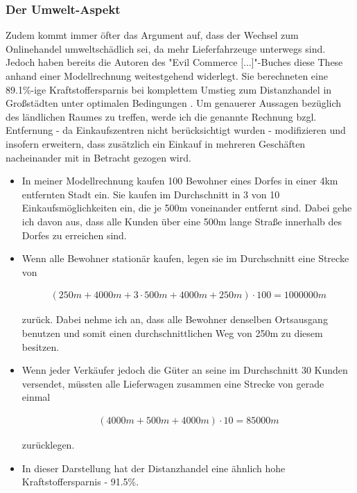 \begin{folding} \subsubsection{Der Umwelt-Aspekt} %

Zudem kommt immer öfter das Argument auf, dass der Wechsel zum Onlinehandel umweltschädlich sei, da mehr Lieferfahrzeuge unterwegs sind. Jedoch haben bereits die Autoren des "Evil Commerce [...]"-Buches diese These anhand einer Modellrechnung weitestgehend widerlegt. Sie berechneten eine 89.1\%-ige Kraftstoffersparnis bei komplettem Umstieg zum Distanzhandel in Großstädten unter optimalen Bedingungen \cite[S. 25f]{evilcom}. Um genauerer Aussagen bezüglich des ländlichen Raumes zu treffen, werde ich die genannte Rechnung bzgl. Entfernung - da Einkaufszentren nicht berücksichtigt wurden - modifizieren und insofern erweitern, dass zusätzlich ein Einkauf in mehreren Geschäften nacheinander mit in Betracht gezogen wird.

\begin{itemize}

\item In meiner Modellrechnung kaufen 100 Bewohner eines Dorfes in einer 4km entfernten Stadt ein. Sie kaufen im Durchschnitt in 3 von 10 Einkaufsmöglichkeiten ein, die je 500m voneinander entfernt sind. Dabei gehe ich davon aus, dass alle Kunden über eine 500m lange Straße innerhalb des Dorfes zu erreichen sind.

\item Wenn alle Bewohner stationär kaufen, legen sie im Durchschnitt eine Strecke von 

\begin{align}(250m + 4000m + 3 \cdot 500m + 4000m + 250m) \cdot 100 = 1000000m\end{align}

 zurück. Dabei nehme ich an, dass alle Bewohner denselben Ortsausgang benutzen und somit einen durchschnittlichen Weg von 250m zu diesem besitzen.

\item Wenn jeder Verkäufer jedoch die Güter an seine im Durchschnitt 30 Kunden versendet, müssten alle Lieferwagen zusammen eine Strecke von gerade einmal 

\begin{align}(4000m + 500m + 4000m) \cdot 10 = 85000m\end{align}

zurücklegen.
\item In dieser Darstellung hat der Distanzhandel eine ähnlich hohe Kraftstoffersparnis - 91.5\%. 


\end{itemize}
\end{folding}
